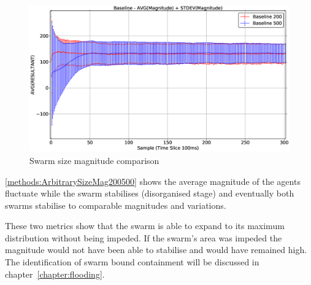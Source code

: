 \begin{figure}[H]
\begin{center}
\includegraphics[width=13cm]{CHAPTER-5/figures/ArbitrarySize200500MAG}
\end{center}
\caption{Swarm size magnitude comparison\label{methods:ArbitrarySizeMag200500}}
\end{figure}

\autoref{methods:ArbitrarySizeMag200500} shows the average magnitude of the agents fluctuate while the swarm stabilises (disorganised stage) and eventually both swarms stabilise to comparable magnitudes and variations.

These two metrics show that the swarm is able to expand to its maximum distribution without being impeded. If the swarm's area was impeded the magnitude would not have been able to stabilise and would have remained high. The identification of swarm bound containment will be discussed in chapter~\ref{chapter:flooding}.



